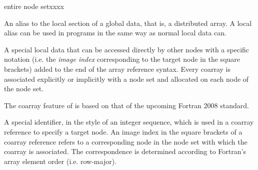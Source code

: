 \begin{namelist}{entire node setxxxx}


 An alias to the local section of a global data, that is, a distributed
 array. A local alias can be used in {\XMP} programs in the same way as
 normal local data can.


 A special local data that can be accessed directly by other nodes with
 a specific notation (i.e. the {\it image index} corresponding to the
 target node in the square brackets) added to the end of the array
 reference syntax.
%
 Every coarray is associated explicitly or implicitly with a node
 set and allocated on each node of the node set.

 The coarray feature of {\XMP} is based on that of the upcoming Fortran
 2008 standard.



 A special identifier, in the style of an integer sequence, which is
 used in a coarray reference to specify a target node. An image index in
 the square brackets of a coarray reference refers to a corresponding
 node in the node set with which the coarray is associated. The
 correspondence is determined according to Fortran's array element order
 (i.e. row-major).


\end{namelist}